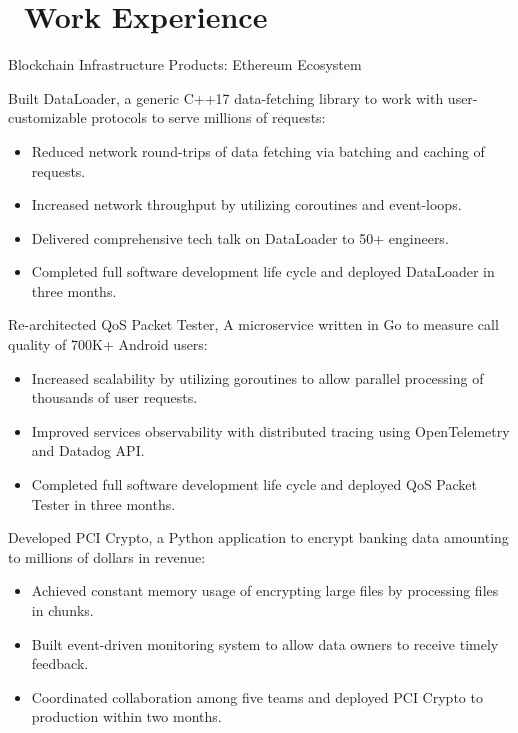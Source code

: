 \documentclass{resume}
\begin{document}
\section{\faUsers\ Work Experience}
 {
  \fontsize{10.5pt}{2}\selectfont
  Blockchain Infrastructure Products: Ethereum Ecosystem


  Built DataLoader, a generic C++17 data-fetching library to work with user-customizable protocols to serve millions of requests:
  \begin{itemize}
    \item {Reduced network round-trips of data fetching via batching and caching of requests.}
    \item {Increased network throughput by utilizing coroutines and event-loops.}
    \item {Delivered comprehensive tech talk on DataLoader to 50+ engineers.}
    \item {Completed full software development life cycle and deployed DataLoader in three months.}
  \end{itemize}

  Re-architected QoS Packet Tester, A microservice written in Go to measure call quality of 700K+ Android users:
  \begin{itemize}
    \item {Increased scalability by utilizing goroutines to allow parallel processing of thousands of user requests.}
    \item {Improved services observability with distributed tracing using OpenTelemetry and Datadog API.}
    \item {Completed full software development life cycle and deployed QoS Packet Tester in three months.}
  \end{itemize}

  Developed PCI Crypto, a Python application to encrypt banking data amounting to millions of dollars in revenue:
  \begin{itemize}
    \item {Achieved constant memory usage of encrypting large files by processing files in chunks.}
    \item {Built event-driven monitoring system to allow data owners to receive timely feedback.}
    \item {Coordinated collaboration among five teams and deployed PCI Crypto to production within two months.}
  \end{itemize}

}
\end{document}
